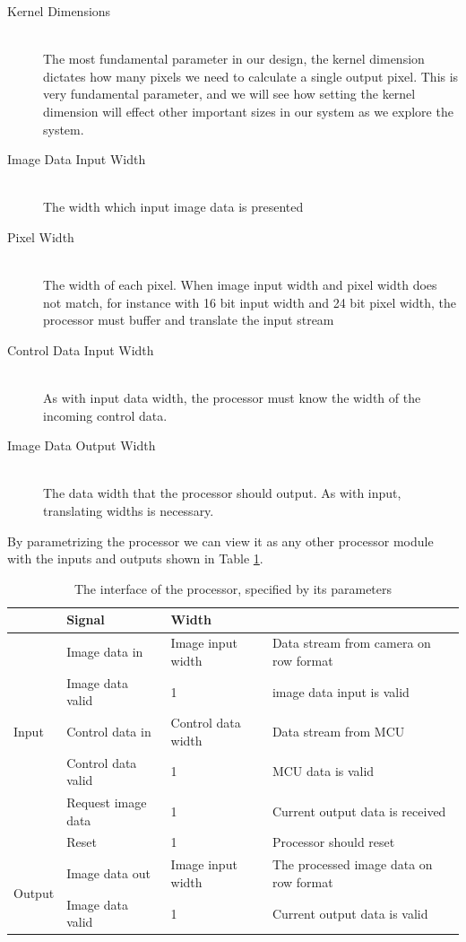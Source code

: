 \begin{description}
    \item[Kernel Dimensions] \hfill \\
        The most fundamental parameter in our design, the kernel dimension dictates how many pixels we need to calculate a single output pixel.
        This is very fundamental parameter, and we will see how setting the kernel dimension will effect other important sizes in our system as we explore the system.
    \item[Image Data Input Width] \hfill \\
        The width which input image data is presented 
    \item[Pixel Width] \hfill \\
        The width of each pixel. When image input width and pixel width does not match, for instance with 16 bit input width and 24 bit pixel width, the processor must buffer and translate the input stream 
    \item[Control Data Input Width] \hfill \\
        As with input data width, the processor must know the width of the incoming control data.
    \item[Image Data Output Width] \hfill \\
        The data width that the processor should output. As with input, translating widths is necessary.
\end{description}

By parametrizing the processor we can view it as any other processor module with the inputs and outputs shown in Table \ref{tbl:ConvolutionEngineIO}.

\begin{table}[h]
    \begin{tabular}{l | l | l | l }
        &   Signal & Width\\
        \hline
        \multirow{5}{*}{Input}
        &   Image data in           & Image input width     & Data stream from camera on row format
        \\
        &   Image data valid        & 1                     & image data input is valid
        \\
        &   Control data in         & Control data width    & Data stream from MCU
        \\
        &   Control data valid      & 1                     & MCU data is valid
        \\
        &   Request image data      & 1                     & Current output data is received
        \\
        &   Reset                   & 1                     & Processor should reset
        \\\hline
        \multirow{2}{*}{Output}
        &   Image data out          & Image input width     & The processed image data on row format\\
        &   Image data valid        & 1                     & Current output data is valid
    \end{tabular}
    \caption{The interface of the processor, specified by its parameters}
    \label{tbl:ConvolutionEngineIO}
\end{table}

